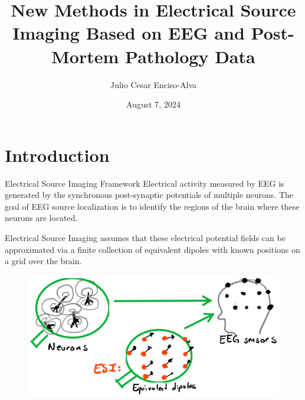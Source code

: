 \documentclass[progressbar=head]{beamer}
\title{New Methods in Electrical Source Imaging Based on EEG and Post-Mortem Pathology Data}
\date{August 7, 2024}
\author{Julio Cesar Enciso-Alva}
\institute{University   of Texas at Arlington}
\newcommand{\R}{\mathbb{R}}
\begin{document}
{
\maketitle

\begin{frame}%
\tableofcontents
\end{frame}

}

{
\section{Introduction}
}

\begin{frame}{Electrical Source Imaging Framework}
    Electrical activity measured by EEG is generated by the synchronous post-synaptic potentials of multiple neurons.
    The goal of EEG source localization is to identify the regions of the brain where these neurons are located.
    
    Electrical Source Imaging assumes that 
    these electrical potential fields
    can be 
    approximated via a finite collection 
    of equivalent dipoles
    with known positions on a grid over the brain.

\begin{figure}
\centering
\includegraphics[width=0.6\linewidth]{./img_oldbeamer/sketch03}
\end{figure}
\end{frame}
\end{document}
